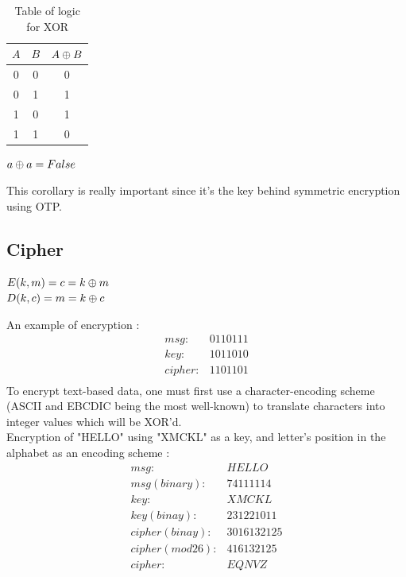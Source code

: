 \begin{table}[ht!]
	\centering
		\begin{tabular}{c|c|c}
			$A$ & $B$ & $A\oplus B$ \\
			\hline
			0 & 0 & 0 \\
			0 & 1 & 1 \\
			1 & 0 & 1 \\
			1 & 1 & 0 \\
			\hline 
		\end{tabular}
	\caption{Table of logic for XOR}
	\label{tab:TableOfLogicForXOR}
\end{table}

\begin{mytheorem}
    $ a \oplus a = False $
\end{mytheorem}
This corollary is really important since it's the key behind symmetric encryption using OTP.

\subsection{Cipher}

\begin{mydef}
\begin{minipage}[t]{0.8\textwidth}
	$ E(k,m) = c = k \oplus m $ \\
	$ D(k,c ) = m = k \oplus c$
\end{minipage}
\end{mydef}

An example of encryption :
\begin{align*}
    msg: & 0 1 1 0 1 1 1      \\
    key: & 1 0 1 1 0 1 0      \\
    cipher: & 1 1 0 1 1 0 1  \\
\end{align*}
To encrypt text-based data, one must first use a character-encoding scheme (ASCII and  EBCDIC being the most well-known) to translate characters into integer values which will be XOR'd. \\

Encryption of "HELLO" using "XMCKL" as a key, and letter's position in the alphabet as an encoding scheme :
\begin{align*}
    msg: & H E L L O        \\
    msg (binary) : & 7 4 11 11 14 \\
    key: & X M C K L   \\
    key (binay) :& 23 12 2 10 11 \\
    cipher (binay): & 30 16 13 21 25  \\
    cipher (mod 26) : & 4 16 13 21 25 \\
    cipher :& E Q N V Z  \\
\end{align*}

